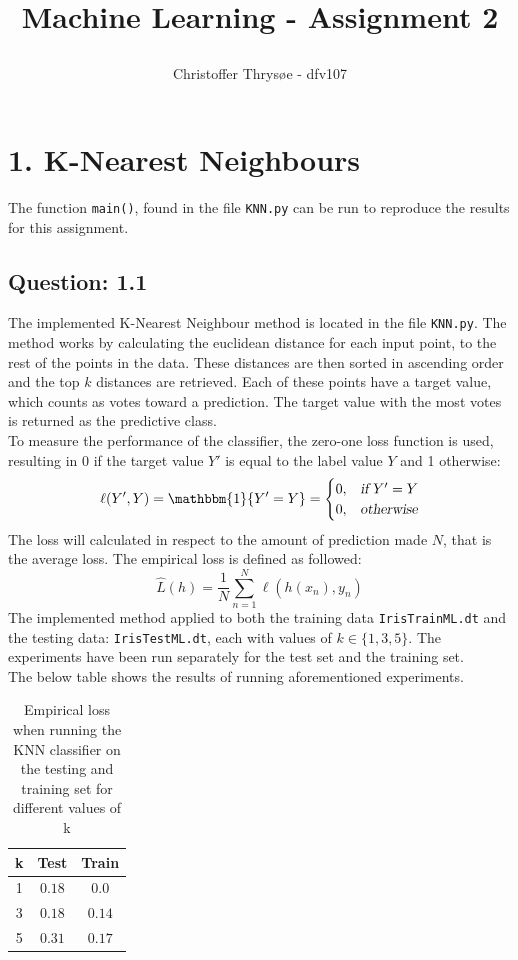 \documentclass{article}
\title{
\vspace{1in}
\textmd{\textbf{Machine Learning - Assignment 2}} \\
\author{Christoffer Thrysøe - dfv107}
}
\begin{document}
\maketitle
{}
\section{1. K-Nearest Neighbours}
The function \texttt{main()}, found in the file \texttt{KNN.py} can be run to reproduce the results for this assignment.
\subsection{Question: 1.1}
The implemented K-Nearest Neighbour method is located in the file \texttt{KNN.py}. The method works by calculating the euclidean distance for each input point, to the rest of the points in the data. These distances are then sorted in ascending order and the top $k$ distances are retrieved. Each of these points have a target value, which counts as votes toward a prediction. The target value with the most votes is returned as the predictive class.
\\
To measure the performance of the classifier, the zero-one loss function is used, resulting in 0 if the target value $Y'$ is equal to the label value $Y$ and 1 otherwise:
\begin{equation*}
\begin{split}
\ell(Y',Y) =
\mathbbm{1} \lbrace Y'= Y \rbrace =
\begin{cases}
0,& \textsl{if } Y' = Y  \\
0,&  \textsl{otherwise}
\end{cases}
\end{split}
\label{indikator}
\end{equation*}
The loss will calculated in respect to the amount of prediction made $N$, that is the average loss. The empirical loss is defined as followed:
\begin{equation*}
\hat{L}(h) =  \dfrac{1}{N}\sum\limits^{N}_{n=1} \ell (h(x_n),y_n)
\end{equation*}
The implemented method applied to both the training data \texttt{IrisTrainML.dt} and the testing data: \texttt{IrisTestML.dt}, each with values of $k \in \lbrace 1,3,5 \rbrace$.
The experiments have been run separately for the test set and the training set.
\\
The below table shows the results of running aforementioned experiments.
\begin{table}[H]
  \centering
  \label{tab:table1}
  \begin{tabular}{c||c|c}
    \textsf{k} & \textsf{Test} & \textsf{Train} \\
    \hline
    1 & $0.18$ & $0.0$ \\
    3 & $0.18$ & $0.14$ \\    
    5 & $0.31$ & $0.17$\\
  \end{tabular}
  \caption{Empirical loss when running the KNN classifier on the testing and training set for different values of k} 
\end{table}
\end{document}
